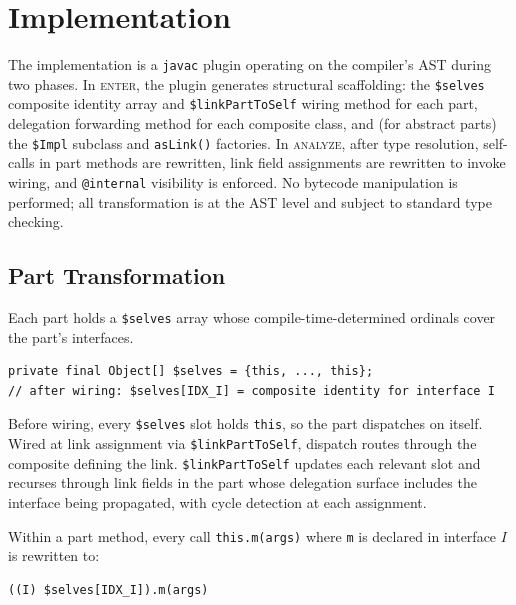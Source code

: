 \documentclass[sigplan,10pt,review,anonymous]{acmart}
\theoremstyle{acmplain}
\newcommand{\code}[1]{\texttt{#1}}
\begin{document}
\section{Implementation}
\label{sec:impl}

The implementation is a \texttt{javac} plugin operating on the compiler's AST
during two phases. In \textsc{enter}, the plugin generates structural
scaffolding: the \code{\$selves} composite identity array and
\code{\$linkPartToSelf} wiring method for each part, delegation
forwarding method for each composite class, and (for abstract parts) the
\code{\$Impl} subclass and \code{asLink()} factories. In \textsc{analyze},
after type resolution, self-calls in part methods are rewritten,
link field assignments are rewritten to invoke wiring, and
\code{@internal} visibility is enforced. No bytecode manipulation is performed;
all transformation is at the AST level and subject to standard type checking.

\subsection{Part Transformation}

Each part holds a \code{\$selves} array whose compile-time-determined ordinals
cover the part's interfaces.

\begin{lstlisting}[language={},style=java]
private final Object[] $selves = {this, ..., this};
// after wiring: $selves[IDX_I] = composite identity for interface I
\end{lstlisting}

Before wiring, every \code{\$selves} slot holds \code{this}, so the part
dispatches on itself. Wired at link assignment via \code{\$linkPartToSelf}, dispatch routes
through the composite defining the link. \code{\$linkPartToSelf} updates each
relevant slot and recurses through link fields in the part whose delegation
surface includes the interface being propagated, with cycle detection at each
assignment.

Within a part method, every call \code{this.m(args)} where
\code{m} is declared in interface $I$ is rewritten to:

\begin{lstlisting}
((I) $selves[IDX_I]).m(args)
\end{lstlisting}
\end{document}
